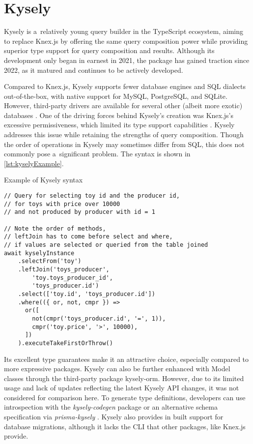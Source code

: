 \section{Kysely}
Kysely is a~relatively young query builder in the TypeScript ecosystem, aiming
to replace Knex.js by offering the same query composition power while providing
superior type support for query composition and results. Although its
development only began in earnest in 2021, the package has gained traction since
2022, as it matured and continues to be actively developed.

Compared to Knex.js, Kysely supports fewer database engines and SQL dialects
out-of-the-box, with native support for MySQL, PostgreSQL, and SQLite. However,
third-party drivers are available for several other (albeit more exotic)
databases \cite{kyselyWeb}. One of the driving forces behind Kysely's creation
was Knex.js's excessive permissiveness, which limited its type support
capabilities \cite{kyselyGithub}. Kysely addresses this issue while retaining
the strengths of query composition. Though the order of operations in Kysely may
sometimes differ from SQL, this does not commonly pose a~significant problem.
The syntax is shown in \autoref{lst:kyselyExample}.

\begin{listing}[ht]
    \caption{Example of Kysely syntax}
    \label{lst:kyselyExample}
    \begin{verbatim}
// Query for selecting toy id and the producer id, 
// for toys with price over 10000 
// and not produced by producer with id = 1

// Note the order of methods, 
// leftJoin has to come before select and where, 
// if values are selected or queried from the table joined
await kyselyInstance
    .selectFrom('toy')
    .leftJoin('toys_producer', 
        'toy.toys_producer_id', 
        'toys_producer.id')
    .select(['toy.id', 'toys_producer.id'])
    .where(({ or, not, cmpr }) =>
      or([
        not(cmpr('toys_producer.id', '=', 1)),
        cmpr('toy.price', '>', 10000),
      ])
    ).executeTakeFirstOrThrow()
\end{verbatim}
\end{listing}

Its excellent type guarantees make it an attractive choice, especially compared
to more expressive packages. Kysely can also be further enhanced with Model
classes through the third-party package kysely-orm. However, due to its limited
usage and lack of updates reflecting the latest Kysely API changes, it was not
considered for comparison here. To generate type definitions, developers can use
introspection with the \textit{kysely-codegen} package \cite{kyselyCodegen} or
an alternative schema specification via \textit{prisma-kysely}
\cite{kyselyPrisma}. Kysely also provides in built support for database
migrations, although it lacks the CLI that other packages, like Knex.js
provide.

